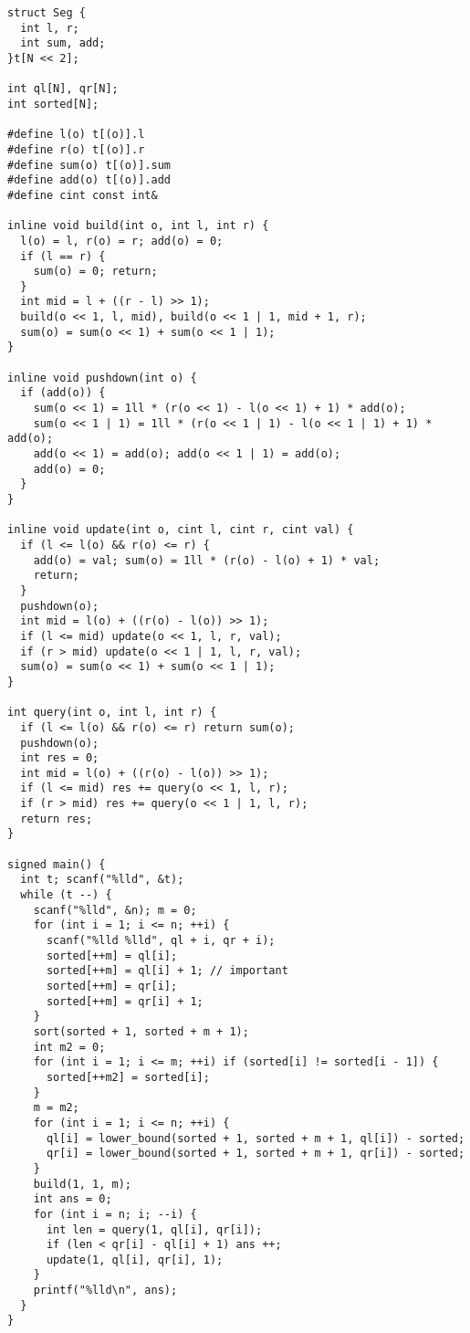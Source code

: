 \begin{lstlisting}
struct Seg {
  int l, r;
  int sum, add;
}t[N << 2];

int ql[N], qr[N];
int sorted[N];

#define l(o) t[(o)].l
#define r(o) t[(o)].r
#define sum(o) t[(o)].sum
#define add(o) t[(o)].add
#define cint const int&

inline void build(int o, int l, int r) {
  l(o) = l, r(o) = r; add(o) = 0;
  if (l == r) {
    sum(o) = 0; return;
  }
  int mid = l + ((r - l) >> 1);
  build(o << 1, l, mid), build(o << 1 | 1, mid + 1, r);
  sum(o) = sum(o << 1) + sum(o << 1 | 1);
}

inline void pushdown(int o) {
  if (add(o)) {
    sum(o << 1) = 1ll * (r(o << 1) - l(o << 1) + 1) * add(o);
    sum(o << 1 | 1) = 1ll * (r(o << 1 | 1) - l(o << 1 | 1) + 1) * add(o);
    add(o << 1) = add(o); add(o << 1 | 1) = add(o);
    add(o) = 0;
  }
}

inline void update(int o, cint l, cint r, cint val) {
  if (l <= l(o) && r(o) <= r) {
    add(o) = val; sum(o) = 1ll * (r(o) - l(o) + 1) * val;
    return;
  }
  pushdown(o);
  int mid = l(o) + ((r(o) - l(o)) >> 1);
  if (l <= mid) update(o << 1, l, r, val);
  if (r > mid) update(o << 1 | 1, l, r, val);
  sum(o) = sum(o << 1) + sum(o << 1 | 1);
}

int query(int o, int l, int r) {
  if (l <= l(o) && r(o) <= r) return sum(o);
  pushdown(o);
  int res = 0;
  int mid = l(o) + ((r(o) - l(o)) >> 1);
  if (l <= mid) res += query(o << 1, l, r);
  if (r > mid) res += query(o << 1 | 1, l, r);
  return res;
}

signed main() {
  int t; scanf("%lld", &t);
  while (t --) {
    scanf("%lld", &n); m = 0;
    for (int i = 1; i <= n; ++i) {
      scanf("%lld %lld", ql + i, qr + i);
      sorted[++m] = ql[i];
      sorted[++m] = ql[i] + 1; // important
      sorted[++m] = qr[i];
      sorted[++m] = qr[i] + 1;
    }
    sort(sorted + 1, sorted + m + 1);
    int m2 = 0;
    for (int i = 1; i <= m; ++i) if (sorted[i] != sorted[i - 1]) {
      sorted[++m2] = sorted[i];
    }
    m = m2;
    for (int i = 1; i <= n; ++i) {
      ql[i] = lower_bound(sorted + 1, sorted + m + 1, ql[i]) - sorted;
      qr[i] = lower_bound(sorted + 1, sorted + m + 1, qr[i]) - sorted;
    }
    build(1, 1, m);
    int ans = 0;
    for (int i = n; i; --i) {
      int len = query(1, ql[i], qr[i]);
      if (len < qr[i] - ql[i] + 1) ans ++;
      update(1, ql[i], qr[i], 1);
    }
    printf("%lld\n", ans);
  }
}

\end{lstlisting}